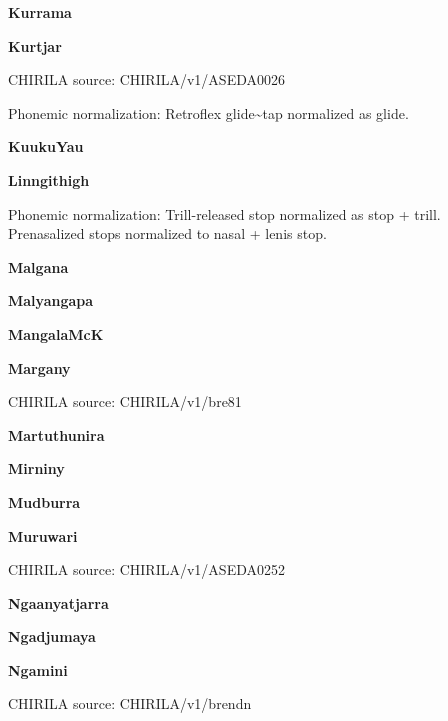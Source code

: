 \textbf{Kurrama}


\textbf{Kurtjar}

CHIRILA source: CHIRILA/v1/ASEDA0026


Phonemic normalization: Retroflex glide\textasciitilde{}tap normalized
as glide.

\textbf{KuukuYau}


\textbf{Linngithigh}


Phonemic normalization: Trill-released stop normalized as stop + trill.
Prenasalized stops normalized to nasal + lenis stop.

\textbf{Malgana}


\textbf{Malyangapa}


\textbf{MangalaMcK}


\textbf{Margany}

CHIRILA source: CHIRILA/v1/bre81


\textbf{Martuthunira}


\textbf{Mirniny}


\textbf{Mudburra}


\textbf{Muruwari}

CHIRILA source: CHIRILA/v1/ASEDA0252


\textbf{Ngaanyatjarra}


\textbf{Ngadjumaya}


\textbf{Ngamini}

CHIRILA source: CHIRILA/v1/brendn


